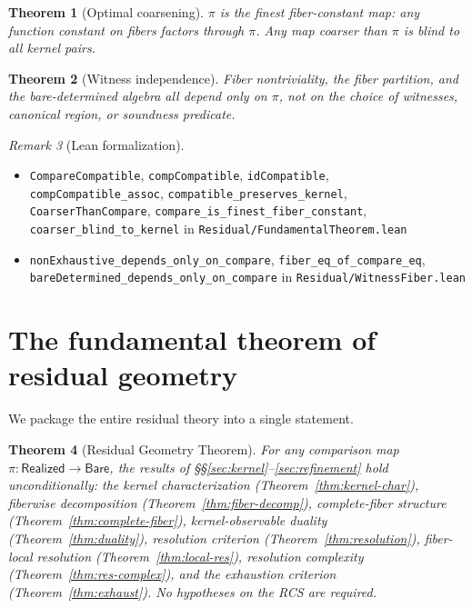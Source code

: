 \documentclass[11pt,a4paper]{article}
\theoremstyle{plain}
\newtheorem{theorem}{Theorem}[section]
\theoremstyle{definition}
\theoremstyle{remark}
\newtheorem{remark}[theorem]{Remark}
\newcommand{\Bare}{\mathsf{Bare}}
\newcommand{\Real}{\mathsf{Realized}}
\newcommand{\compare}{\pi}
\begin{document}
\begin{theorem}[Optimal coarsening]\label{thm:optimal}
$\compare$ is the finest fiber-constant map: any function constant on fibers
factors through $\compare$. Any map coarser than $\compare$ is blind to all
kernel pairs.
\end{theorem}

\begin{theorem}[Witness independence]\label{thm:witness-indep}
Fiber nontriviality, the fiber partition, and the bare-determined algebra all
depend only on $\compare$, not on the choice of witnesses, canonical region,
or soundness predicate.
\end{theorem}

\begin{remark}[Lean formalization]
\leavevmode\par\begin{itemize}[nosep,leftmargin=*,before=\raggedright]
\item \texttt{CompareCompatible}, \texttt{compCompatible}, \texttt{idCompatible}, \texttt{compCompatible\_assoc}, \texttt{compatible\_preserves\_kernel}, \texttt{CoarserThanCompare}, \texttt{compare\_is\_finest\_fiber\_constant}, \texttt{coarser\_blind\_to\_kernel} in \texttt{Residual/FundamentalTheorem.lean}
\item \texttt{nonExhaustive\_depends\_only\_on\_compare}, \texttt{fiber\_eq\_of\_compare\_eq}, \texttt{bareDetermined\_depends\_only\_on\_compare} in \texttt{Residual/WitnessFiber.lean}
\end{itemize}
\end{remark}

\section{The fundamental theorem of residual geometry}\label{sec:fund-thm}

We package the entire residual theory into a single statement.

\begin{theorem}[Residual Geometry Theorem]\label{thm:fund-res}
For any comparison map $\compare : \Real \to \Bare$, the results of
\S\S\ref{sec:kernel}--\ref{sec:refinement} hold unconditionally: the kernel
characterization (Theorem~\ref{thm:kernel-char}), fiberwise decomposition
(Theorem~\ref{thm:fiber-decomp}), complete-fiber structure
(Theorem~\ref{thm:complete-fiber}), kernel-observable duality
(Theorem~\ref{thm:duality}), resolution criterion
(Theorem~\ref{thm:resolution}), fiber-local resolution
(Theorem~\ref{thm:local-res}), resolution complexity
(Theorem~\ref{thm:res-complex}), and the exhaustion criterion
(Theorem~\ref{thm:exhaust}). No hypotheses on the RCS are required.
\end{theorem}
\end{document}
